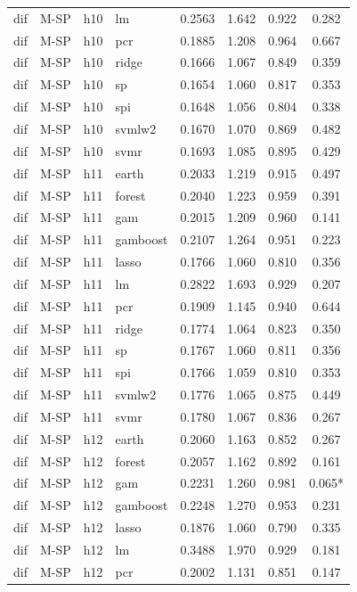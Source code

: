 \begin{ThreePartTable}
\begin{longtable}[t]{llclcccc}
dif & M-SP & h10 & lm & 0.2563 & 1.642 & 0.922 & 0.282\\
dif & M-SP & h10 & pcr & 0.1885 & 1.208 & 0.964 & 0.667\\
dif & M-SP & h10 & ridge & 0.1666 & 1.067 & 0.849 & 0.359\\
dif & M-SP & h10 & sp & 0.1654 & 1.060 & 0.817 & 0.353\\
dif & M-SP & h10 & spi & 0.1648 & 1.056 & 0.804 & 0.338\\
dif & M-SP & h10 & svmlw2 & 0.1670 & 1.070 & 0.869 & 0.482\\
dif & M-SP & h10 & svmr & 0.1693 & 1.085 & 0.895 & 0.429\\
\addlinespace
dif & M-SP & h11 & earth & 0.2033 & 1.219 & 0.915 & 0.497\\
dif & M-SP & h11 & forest & 0.2040 & 1.223 & 0.959 & 0.391\\
dif & M-SP & h11 & gam & 0.2015 & 1.209 & 0.960 & 0.141\\
dif & M-SP & h11 & gamboost & 0.2107 & 1.264 & 0.951 & 0.223\\
dif & M-SP & h11 & lasso & 0.1766 & 1.060 & 0.810 & 0.356\\
dif & M-SP & h11 & lm & 0.2822 & 1.693 & 0.929 & 0.207\\
dif & M-SP & h11 & pcr & 0.1909 & 1.145 & 0.940 & 0.644\\
dif & M-SP & h11 & ridge & 0.1774 & 1.064 & 0.823 & 0.350\\
dif & M-SP & h11 & sp & 0.1767 & 1.060 & 0.811 & 0.356\\
dif & M-SP & h11 & spi & 0.1766 & 1.059 & 0.810 & 0.353\\
dif & M-SP & h11 & svmlw2 & 0.1776 & 1.065 & 0.875 & 0.449\\
dif & M-SP & h11 & svmr & 0.1780 & 1.067 & 0.836 & 0.267\\
\addlinespace
dif & M-SP & h12 & earth & 0.2060 & 1.163 & 0.852 & 0.267\\
dif & M-SP & h12 & forest & 0.2057 & 1.162 & 0.892 & 0.161\\
dif & M-SP & h12 & gam & 0.2231 & 1.260 & 0.981 & 0.065*\\
dif & M-SP & h12 & gamboost & 0.2248 & 1.270 & 0.953 & 0.231\\
dif & M-SP & h12 & lasso & 0.1876 & 1.060 & 0.790 & 0.335\\
dif & M-SP & h12 & lm & 0.3488 & 1.970 & 0.929 & 0.181\\
dif & M-SP & h12 & pcr & 0.2002 & 1.131 & 0.851 & 0.147\\

\end{longtable}
\end{ThreePartTable}
